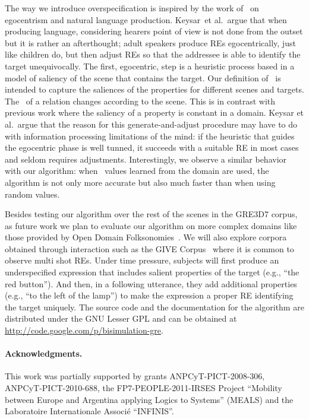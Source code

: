 The way we introduce overspecification is inspired by the work of~ on egocentrism and natural language production.  Keysar~et al.\ argue that when producing language, considering hearers point of view is not done from the outset but it is rather an afterthought; adult speakers produce REs egocentrically, just like children do, but then adjust REs so that the addressee is able to identify the target unequivocally. The first, egocentric, step is a heuristic process based in a model of saliency of the scene that contains the target. 
Our definition of \puse\ is intended to capture the saliences of the properties for different scenes and targets. The \puse\ of a relation changes according to the scene. This is in contrast with previous work where the saliency of a property is constant in a domain. Keysar et al.~argue that the reason for this generate-and-adjust procedure may have to do with information processing limitations of the mind: if the heuristic that guides the egocentric phase is well tunned, it succeeds with a suitable RE in most cases and seldom requires adjustments. Interestingly, we observe a similar behavior with our algorithm: when \puse\ values learned from the domain are used, the algorithm is not only more accurate but also much faster than when using random \puse values. 

Besides testing our algorithm over the rest of the scenes in the GRE3D7 corpus, 
as future work we plan to evaluate our algorithm on more complex domains 
like those provided by Open Domain Folksonomies~\cite{pacheco-duboue-dominguez:2012:NAACL-HLT}. We will also 
explore corpora obtained through interaction
such as the GIVE Corpus~\cite{GarGarKolStr10} where it is common to observe multi shot REs. Under time pressure, subjects will first produce an underspecified expression that includes salient properties of the target (e.g., ``the red button'').  And then, in a following utterance, they add additional properties (e.g., ``to the left of the lamp'') to make the expression a proper RE  identifying the target uniquely. The source code and the documentation for the algorithm are distributed under the GNU Lesser GPL and can be obtained at \url{http://code.google.com/p/bisimulation-gre}.

\begin{small}
\paragraph{Acknowledgments.}
 This work was partially supported by grants ANPCyT-PICT-2008-306, ANPCyT-PICT-2010-688, the FP7-PEOPLE-2011-IRSES Project
``Mobility between Europe and Argentina applying Logics to Systems'' (MEALS)
and the Laboratoire Internationale Associ\'e ``INFINIS''.
\end{small}
